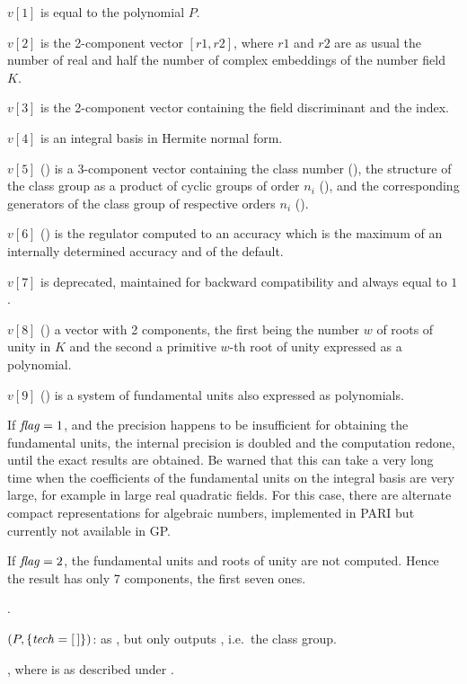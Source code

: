  $v[1]$ is equal to the polynomial $P$.

 $v[2]$ is the 2-component vector $[r1,r2]$, where $r1$ and $r2$ are as usual
the number of real and half the number of complex embeddings of the number
field $K$.

 $v[3]$ is the 2-component vector containing the field discriminant and the
index.

 $v[4]$ is an integral basis in Hermite normal form.

 $v[5]$ () is a 3-component vector containing the class number
(), the structure of the class group as a product of cyclic
groups of order $n_i$ (), and the corresponding generators
of the class group of respective orders $n_i$ ().

 $v[6]$ () is the regulator computed to an accuracy which is the
maximum of an internally determined accuracy and of the default.

 $v[7]$ is deprecated, maintained for backward compatibility and always equal
to $1$.

 $v[8]$ () a vector with 2 components, the first being the number
$w$ of roots of unity in $K$ and the second a primitive $w$-th root of unity
expressed as a polynomial.

 $v[9]$ () is a system of fundamental units also expressed as
polynomials.

If $\hbox{\it f\kern0pt lag\/}=1$, and the precision happens to be insufficient for obtaining the
fundamental units, the internal precision is doubled and the computation
redone, until the exact results are obtained. Be warned that this can take a
very long time when the coefficients of the fundamental units on the integral
basis are very large, for example in large real quadratic fields.
For this case, there are alternate compact representations for algebraic
numbers, implemented in PARI but currently not available in GP.

If $\hbox{\it f\kern0pt lag\/}=2$, the fundamental units and roots of unity are not computed.
Hence the result has only 7 components, the first seven ones.

.

$(P,\{\hbox{\it tech\/}=[\,]\})$: as , but only
outputs , i.e.~the class group.

, where 
is as described under .

